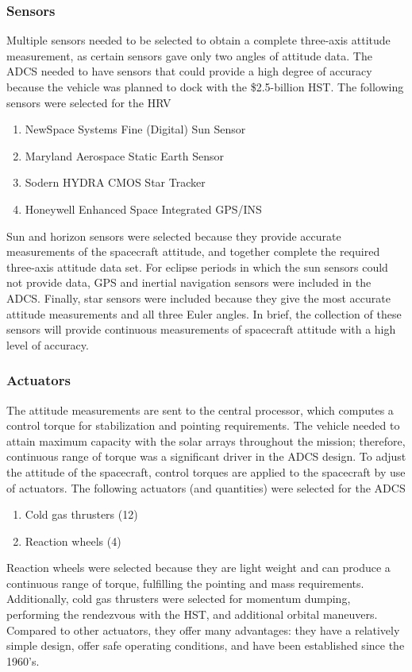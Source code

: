 \documentclass[paper=letter, fontsize=11pt]{scrartcl} %
\numberwithin{equation}{section} %
\numberwithin{figure}{section} %
\numberwithin{table}{section} %
\begin{document}
\subsubsection{Sensors}
\noindent Multiple sensors needed to be selected to obtain a complete three-axis attitude measurement, as certain sensors gave only two angles of attitude data. The ADCS needed to have sensors that could provide a high degree of accuracy because the vehicle was planned to dock with the \$2.5-billion HST. The following sensors were selected for the HRV
\begin{enumerate}
    \item NewSpace Systems Fine (Digital) Sun Sensor
    \item Maryland Aerospace Static Earth Sensor
    \item Sodern HYDRA CMOS Star Tracker
    \item Honeywell Enhanced Space Integrated GPS/INS
\end{enumerate}
\bigskip
\par Sun and horizon sensors were selected because they provide accurate measurements of the spacecraft attitude, and together complete the required three-axis attitude data set. For eclipse periods in which the sun sensors could not provide data, GPS and inertial navigation sensors were included in the ADCS. Finally, star sensors were included because they give the most accurate attitude measurements and all three Euler angles. In brief, the collection of these sensors will provide continuous measurements of spacecraft attitude with a high level of accuracy.
\subsubsection{Actuators}
The attitude measurements are sent to the central processor, which computes a control torque for stabilization and pointing requirements. The vehicle needed to attain maximum capacity with the solar arrays throughout the mission; therefore, continuous range of torque was a significant driver in the ADCS design. To adjust the attitude of the spacecraft, control torques are applied to the spacecraft by use of actuators. The following actuators (and quantities) were selected for the ADCS
\begin{enumerate}
    \item Cold gas thrusters (12)
    \item Reaction wheels (4)
\end{enumerate}

\par Reaction wheels were selected because they are light weight and can produce a continuous range of torque, fulfilling the pointing and mass requirements. Additionally, cold gas thrusters were selected for momentum dumping, performing the rendezvous with the HST, and additional orbital maneuvers. Compared to other actuators, they offer many advantages: they have a relatively simple design, offer safe operating conditions, and have been established since the 1960's.
\end{document}
